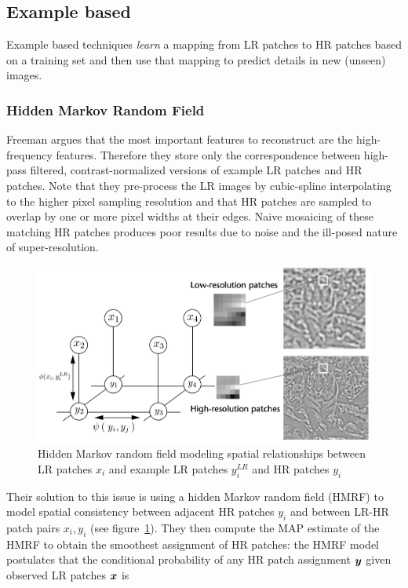 \subsection{Example based}\label{subsec:example-based}

Example based techniques \textit{learn} a mapping from
LR patches to HR patches based on a training set and then use that mapping to predict details in new (unseen) images.

\subsubsection{Hidden Markov Random Field}

Freeman \etal\cite{freeman2002example} argues that the most important features to reconstruct are the high-frequency features.
%
Therefore they store only the correspondence between high-pass filtered, contrast-normalized versions of example LR patches and HR patches.
%
Note that they pre-process the LR images by cubic-spline interpolating to the higher pixel sampling resolution and that HR patches are sampled to overlap by one or more pixel widths at their edges.
%
Naive mosaicing of these matching HR patches produces poor results due to noise and the ill-posed nature of super-resolution.
%
\begin{figure}
	\centering
	\includegraphics[width=\linewidth,keepaspectratio]{figures/mrf.png}
	\caption{Hidden Markov random field modeling spatial relationships between LR patches $x_i$ and example LR patches $y_i^{LR}$ and HR patches $y_i$\cite{freeman2002example}}
	\label{fig:mrf}
\end{figure}
Their solution to this issue is using a hidden Markov random field (HMRF) to model spatial consistency between adjacent HR patches $y_i$ and between LR-HR patch pairs $x_i, y_i$ (see figure~\ref{fig:mrf}).
%
They then compute the MAP estimate of the HMRF to obtain the smoothest assignment of HR patches: the HMRF model postulates that the conditional probability of any HR patch assignment $\bm{y}$ given observed LR patches $\bm{x}$ is
